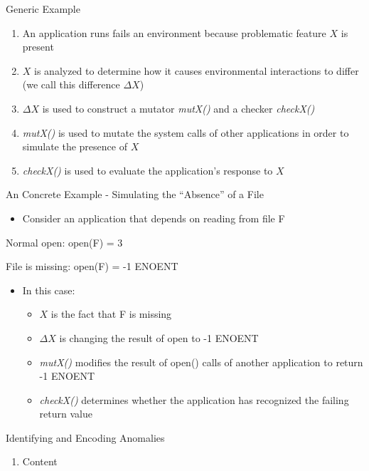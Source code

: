 \documentclass[pdf]{beamer}
\begin{document}
\begin{frame}{Generic Example}
  \begin{enumerate}
    \item{An application runs fails an environment because problematic
      feature $X$ is present}
    \item{$X$ is analyzed to determine how it causes environmental
        interactions to differ (we call this difference $\Delta X$)}
    \item{$\Delta X$ is used to construct a mutator \textit{mutX()} and
      a checker \textit{checkX()}}
    \item{\textit{mutX()} is used to mutate the system calls of other
      applications in order to simulate the presence of $X$}
    \item{\textit{checkX()} is used to evaluate the application's response
      to $X$}
  \end{enumerate}
\end{frame}


\begin{frame}{An Concrete Example - Simulating the ``Absence'' of a File}
  \begin{itemize}
  \item{Consider an application that depends on reading from file F}
  \end{itemize}

  Normal open: open(F) = 3

  File is missing: open(F) = -1 ENOENT

  \begin{itemize}
  \item{In this case:}
    \begin{itemize}
      \item{$X$ is the fact that F is missing}
      \item{$\Delta X$ is changing the result of open to -1 ENOENT}
      \item{\textit{mutX()} modifies the result of open() calls of another
        application to return -1 ENOENT}
      \item{\textit{checkX()} determines whether the application has
        recognized the failing return value}
    \end{itemize}
  \end{itemize}
\end{frame}


\begin{frame}{Identifying and Encoding Anomalies}
  \begin{enumerate}
  \item{Content}
  \end{enumerate}
\end{frame}
\end{document}
